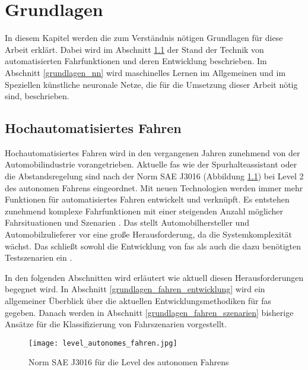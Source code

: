 
\chapter{Grundlagen}
\label{grundlagen}

In diesem Kapitel werden die zum Verständnis nötigen Grundlagen für diese Arbeit erklärt. Dabei wird im Abschnitt \ref{grundlagen_fahren} der Stand der Technik von automatisierten Fahrfunktionen und deren Entwicklung beschrieben. Im Abschnitt \ref{grundlagen_nn} wird maschinelles Lernen im Allgemeinen und im Speziellen künstliche neuronale Netze, die für die Umsetzung dieser Arbeit nötig sind, beschrieben.


\section{Hochautomatisiertes Fahren}
\label{grundlagen_fahren}

Hochautomatisiertes Fahren wird in den vergangenen Jahren zunehmend von der Automobilindustrie vorangetrieben. Aktuelle \gls{fas} wie der Spurhalteassistant oder die Abstandsregelung sind nach der Norm SAE J3016 (Abbildung \ref{fig_level_autonomes_fahren}) bei Level 2 des autonomen Fahrens eingeordnet. Mit neuen Technologien werden immer mehr Funktionen für automatisiertes Fahren entwickelt und verknüpft. Es entstehen zunehmend komplexe Fahrfunktionen mit einer steigenden Anzahl möglicher Fahrsituationen und Szenarien \cite{king2017identification}. Das stellt Automobilhersteller und Automobilzulieferer vor eine große Herausforderung, da die Systemkomplexität wächst. Das schließt sowohl die Entwicklung von \gls{fas} als auch die dazu benötigten Testszenarien ein \cite{pfeffer2016continuous}.

In den folgenden Abschnitten wird erläutert wie aktuell diesen Herausforderungen begegnet wird. In Abschnitt \ref{grundlagen_fahren_entwicklung} wird ein allgemeiner Überblick über die aktuellen Entwicklungsmethodiken für \gls{fas} gegeben. Danach werden in Abschnitt \ref{grundlagen_fahren_szenarien} bisherige Ansätze für die Klassifizierung von Fahrszenarien vorgestellt.

\begin{figure}[h]
\centering
\texttt{[image: level\_autonomes\_fahren.jpg]}
\caption{Norm SAE J3016 für die Level des autonomen Fahrens \cite{sae2014taxonomy}}
\label{fig_level_autonomes_fahren}
\end{figure}


